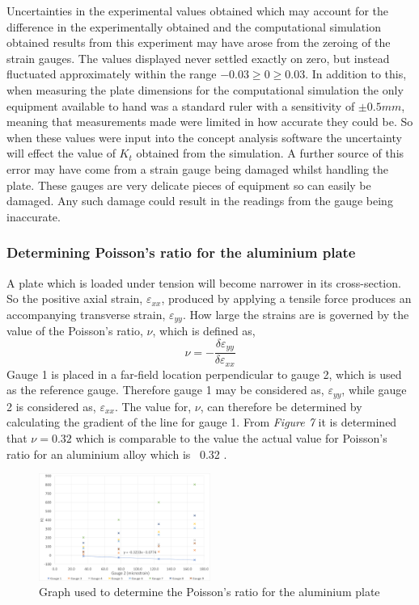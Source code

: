 \documentclass[11pt,twocolumn]{article} %
\begin{document}
Uncertainties in the experimental values obtained which may account for the difference in the experimentally obtained and the computational simulation obtained results from this experiment may have arose from the zeroing of the strain gauges. The values displayed never settled exactly on zero, but instead fluctuated approximately within the range $-0.03\geq 0 \geq 0.03$. In addition to this, when measuring the plate dimensions for the computational simulation the only equipment available to hand was a standard ruler with a sensitivity of $\pm0.5mm$, meaning that measurements made were limited in how accurate they could be. So when these values were input into the concept analysis software the uncertainty will effect the value of $K_{t}$ obtained from the simulation. A further source of this error may have come from a strain gauge being damaged whilst handling the plate. These gauges are very delicate pieces of equipment so can easily be damaged. Any such damage could result in the readings from the gauge being inaccurate. 

\subsubsection{Determining Poisson's ratio for the aluminium plate}

A plate which is loaded under tension will become narrower in its cross-section. So the positive axial strain, $\varepsilon_{xx}$, produced by applying a tensile force produces an accompanying transverse strain, $\varepsilon_{yy}$. How large the strains are is governed by the value of the Poisson's ratio, $\nu$, which is defined as,
\begin{equation} %
\nu = -\frac{\delta\varepsilon_{yy}}{\delta\varepsilon_{xx}} 
\end{equation}
Gauge 1 is placed in a far-field location perpendicular to gauge 2, which is used as the reference gauge. Therefore gauge 1 may be considered as, $\varepsilon_{yy}$, while gauge 2 is considered as, $\varepsilon_{xx}$.
 The value for, $\nu$, can therefore be determined by calculating the gradient of the line for gauge 1. From \textit{Figure 7} it is determined that $\nu = 0.32$ which is comparable to the value the actual value for Poisson's ratio for an aluminium alloy which is ~0.32 \cite{Aluminium}.  
 \begin{figure}[!ht]
	\centering
		\includegraphics[width=0.5\textwidth]{Poissons.png}
	\caption{Graph used to determine the Poisson's ratio for the aluminium plate}
\end{figure}
\end{document}

